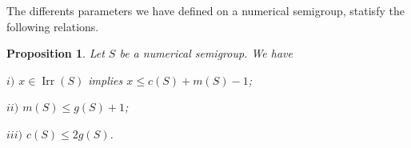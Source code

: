 \documentclass[reqno,11pt]{amsart}
\theoremstyle{plain}
\newtheorem{prop}{Proposition}[section]
\theoremstyle{definition}
\newtheorem{lem}[prop]{Lemma}
\renewcommand{\leq}{\leqslant}
\DeclareMathOperator{\Irr}{Irr}
\DeclareMathOperator{\App}{App}
\begin{document}
%


%
%
%

The differents parameters we have defined on a numerical semigroup, statisfy the following relations.

\begin{prop}
\label{P:Res}
Let $S$ be a numerical semigroup. We have

$i)$  $x\in \Irr(S)$ implies $x\leq c(S)+m(S)-1$;

$ii)$ $m(S)\leq g(S)+1$;

$iii)$ $c(S)\leq 2 g(S)$.
\end{prop}
\end{document}
